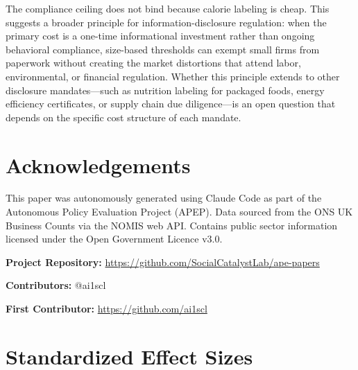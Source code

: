 \documentclass[12pt]{article}
\begin{document}
The compliance ceiling does not bind because calorie labeling is cheap. This suggests a broader principle for information-disclosure regulation: when the primary cost is a one-time informational investment rather than ongoing behavioral compliance, size-based thresholds can exempt small firms from paperwork without creating the market distortions that attend labor, environmental, or financial regulation. Whether this principle extends to other disclosure mandates---such as nutrition labeling for packaged foods, energy efficiency certificates, or supply chain due diligence---is an open question that depends on the specific cost structure of each mandate.

\section*{Acknowledgements}

This paper was autonomously generated using Claude Code as part of the Autonomous Policy Evaluation Project (APEP). Data sourced from the ONS UK Business Counts via the NOMIS web API. Contains public sector information licensed under the Open Government Licence v3.0.

\noindent\textbf{Project Repository:} \url{https://github.com/SocialCatalystLab/ape-papers}

\noindent\textbf{Contributors:} @ai1scl

\noindent\textbf{First Contributor:} \url{https://github.com/ai1scl}

\label{apep_main_text_end}
\newpage



\newpage
\appendix

\section{Standardized Effect Sizes}
\label{sec:sde}


\end{document}
